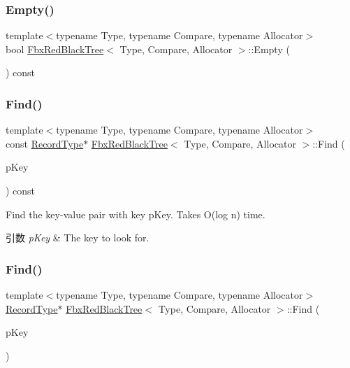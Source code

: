 \subsubsection{\texorpdfstring{Empty()}{Empty()}}
{\footnotesize\ttfamily template$<$typename Type, typename Compare, typename Allocator$>$ \\
bool \hyperlink{class_fbx_red_black_tree}{Fbx\+Red\+Black\+Tree}$<$ Type, Compare, Allocator $>$\+::Empty (\begin{DoxyParamCaption}{ }\end{DoxyParamCaption}) const}

\mbox{\label{class_fbx_red_black_tree_a08a08c8b1a259c5d5bba01558198e4cb}} 
\subsubsection{\texorpdfstring{Find()}{Find()}\hspace{0.1cm}{\footnotesize\ttfamily [1/2]}}
{\footnotesize\ttfamily template$<$typename Type, typename Compare, typename Allocator$>$ \\
const \hyperlink{class_fbx_red_black_tree_1_1_record_type}{Record\+Type}$\ast$ \hyperlink{class_fbx_red_black_tree}{Fbx\+Red\+Black\+Tree}$<$ Type, Compare, Allocator $>$\+::Find (\begin{DoxyParamCaption}\item[{const \hyperlink{class_fbx_red_black_tree_a241b31c6972995417d193458b7bb27e2}{Key\+Type} \&}]{p\+Key }\end{DoxyParamCaption}) const}

Find the key-\/value pair with key p\+Key. Takes O(log n) time. 
\begin{DoxyParams}{引数}
{\em p\+Key} & The key to look for. \\
\hline
\end{DoxyParams}
\mbox{\label{class_fbx_red_black_tree_a10d0f431d89e767bee24812cc4be9f3f}} 
\subsubsection{\texorpdfstring{Find()}{Find()}\hspace{0.1cm}{\footnotesize\ttfamily [2/2]}}
{\footnotesize\ttfamily template$<$typename Type, typename Compare, typename Allocator$>$ \\
\hyperlink{class_fbx_red_black_tree_1_1_record_type}{Record\+Type}$\ast$ \hyperlink{class_fbx_red_black_tree}{Fbx\+Red\+Black\+Tree}$<$ Type, Compare, Allocator $>$\+::Find (\begin{DoxyParamCaption}\item[{const \hyperlink{class_fbx_red_black_tree_a241b31c6972995417d193458b7bb27e2}{Key\+Type} \&}]{p\+Key }\end{DoxyParamCaption})}

